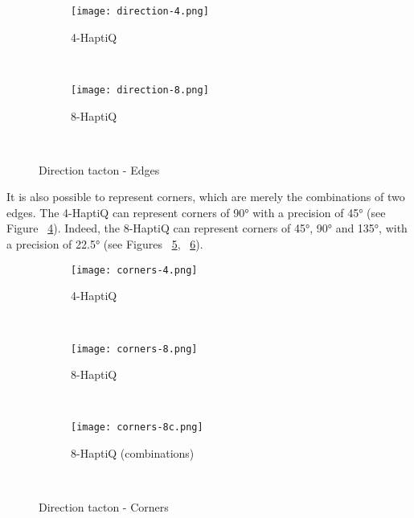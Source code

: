 \begin{figure}[H]
        \centering
        \begin{subfigure}[H]{0.3\textwidth}
                \texttt{[image: direction-4.png]}
                \caption{4-HaptiQ}
                \label{fig:direction-4}
        \end{subfigure}%
        ~ %
        \begin{subfigure}[H]{0.5\textwidth}
                \texttt{[image: direction-8.png]}
                \caption{8-HaptiQ}
                \label{fig:direction-8}
        \end{subfigure}
        ~ %
        \caption{Direction tacton - Edges}\label{fig:edges}
\end{figure}

It is also possible to represent corners, which are merely the combinations of two edges. The 4-HaptiQ can represent corners of 90° with a precision of 45° (see Figure ~\ref{fig:corner-4}). Indeed, the 8-HaptiQ can represent corners of 45°, 90° and 135°, with a precision of 22.5° (see Figures ~\ref{fig:corner-8}, ~\ref{fig:corner-8c}). 

\begin{figure}[H]
        \centering
        \begin{subfigure}[H]{0.5\textwidth}
                \texttt{[image: corners-4.png]}
                \caption{4-HaptiQ}
                \label{fig:corner-4}
        \end{subfigure}%
        ~ %
          
        \begin{subfigure}[H]{0.4\textwidth}
                \texttt{[image: corners-8.png]}
                \caption{8-HaptiQ}
                \label{fig:corner-8}
        \end{subfigure}
        ~ 
         \begin{subfigure}[H]{0.4\textwidth}
                \texttt{[image: corners-8c.png]}
                \caption{8-HaptiQ (combinations)}
                \label{fig:corner-8c}
        \end{subfigure}
        ~ %
        \caption{Direction tacton - Corners}\label{fig:corners}
\end{figure}

